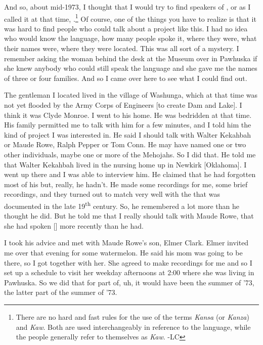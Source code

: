 \documentclass[output=paper]{LSP/langsci}
\begin{document}
And so, about mid-1973, I thought that I would try to find speakers of , or as I called it at that time, .\footnote{There are no hard and fast rules for the use of the terms \textit{Kansa} (or \textit{Kanza}) and \textit{Kaw}. Both are used interchangeably in reference to the language, while the people generally refer to themselves as \textit{Kaw}. -LC} Of course, one of the things you have to realize is that it was hard to find people who could talk about a project like this. I had no idea who would know the  language, how many people spoke it, where they were, what their names were, where they were located. This was all sort of a mystery. I remember asking the woman behind the desk at the  Museum over in Pawhuska if she knew anybody who could still speak the  language and she gave me the names of three or four families. And so I came over here to see what I could find out. 

The gentleman I located lived in the village of Washunga, which at that time was not yet flooded by the Army Corps of Engineers [to create  Dam and  Lake]. I think it was Clyde Monroe. I went to his home. He was bedridden at that time. His family permitted me to talk with him for a few minutes, and I told him the kind of project I was interested in. He said I should talk with Walter Kekahbah or Maude Rowe, Ralph Pepper or Tom Conn. He may have named one or two other individuals, maybe one or more of the Mehojahs. So I did that. He told me that Walter Kekahbah lived in the nursing home up in Newkirk [Oklahoma]. I went up there and I was able to interview him. He claimed that he had forgotten most of his  but, really, he hadn't. He made some recordings for me, some brief recordings, and they turned out to match very well with the  that was documented in the late 19\textsuperscript{th} century. So, he remembered a lot more  than he thought he did. But he told me that I really should talk with Maude Rowe, that she had spoken [] more recently than he had. 

I took his advice and met with Maude Rowe's son, Elmer Clark. Elmer invited me over that evening for some watermelon. He said his mom was going to be there, so I got together with her. She agreed to make recordings for me and so I set up a schedule to visit her weekday afternoons at 2:00 where she was living in Pawhuska. So we did that for part of, uh, it would have been the summer of '73, the latter part of the summer of '73. 
\end{document}
